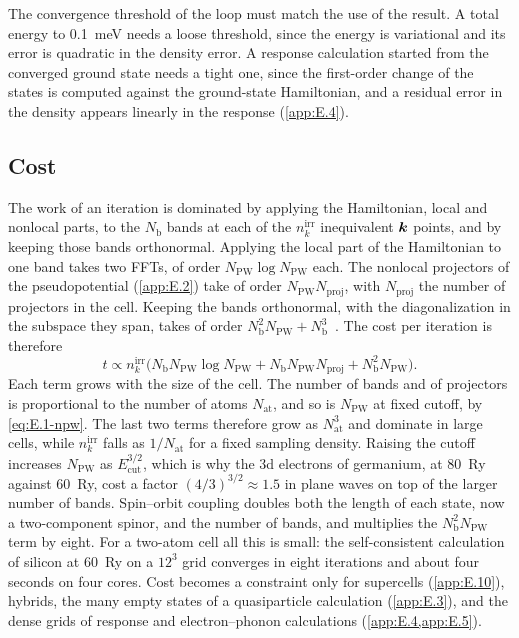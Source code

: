 The convergence threshold of the loop must match the use of the result. A total energy to \SI{0.1}{meV} needs a loose threshold, since the energy is variational and its error is quadratic in the density error. A response calculation started from the converged ground state needs a tight one, since the first-order change of the states is computed against the ground-state Hamiltonian, and a residual error in the density appears linearly in the response (\cref{app:E.4}).

\subsection{Cost}

The work of an iteration is dominated by applying the Hamiltonian, local and nonlocal parts, to the $N_{\mathrm{b}}$ bands at each of the $n_k^{\mathrm{irr}}$ inequivalent $\bm{k}$ points, and by keeping those bands orthonormal. Applying the local part of the Hamiltonian to one band takes two FFTs, of order $N_{\mathrm{PW}}\log N_{\mathrm{PW}}$ each. The nonlocal projectors of the pseudopotential (\cref{app:E.2}) take of order $N_{\mathrm{PW}}N_{\mathrm{proj}}$, with $N_{\mathrm{proj}}$ the number of projectors in the cell. Keeping the bands orthonormal, with the diagonalization in the subspace they span, takes of order $N_{\mathrm{b}}^2N_{\mathrm{PW}} + N_{\mathrm{b}}^3$~\cite{payne1992iterative}. The cost per iteration is therefore
\begin{equation}
  t \propto n_k^{\mathrm{irr}}\bigl(N_{\mathrm{b}}N_{\mathrm{PW}}\log N_{\mathrm{PW}} + N_{\mathrm{b}}N_{\mathrm{PW}}N_{\mathrm{proj}} + N_{\mathrm{b}}^2N_{\mathrm{PW}}\bigr) .
  \label{eq:E.1-cost}
\end{equation}
Each term grows with the size of the cell. The number of bands and of projectors is proportional to the number of atoms $N_{\mathrm{at}}$, and so is $N_{\mathrm{PW}}$ at fixed cutoff, by \cref{eq:E.1-npw}. The last two terms therefore grow as $N_{\mathrm{at}}^3$ and dominate in large cells, while $n_k^{\mathrm{irr}}$ falls as $1/N_{\mathrm{at}}$ for a fixed sampling density. Raising the cutoff increases $N_{\mathrm{PW}}$ as $E_{\mathrm{cut}}^{3/2}$, which is why the 3d electrons of germanium, at \SI{80}{Ry} against \SI{60}{Ry}, cost a factor $(4/3)^{3/2} \approx 1.5$ in plane waves on top of the larger number of bands. Spin--orbit coupling doubles both the length of each state, now a two-component spinor, and the number of bands, and multiplies the $N_{\mathrm{b}}^2N_{\mathrm{PW}}$ term by eight. For a two-atom cell all this is small: the self-consistent calculation of silicon at \SI{60}{Ry} on a $12^3$ grid converges in eight iterations and about four seconds on four cores. Cost becomes a constraint only for supercells (\cref{app:E.10}), hybrids, the many empty states of a quasiparticle calculation (\cref{app:E.3}), and the dense grids of response and electron--phonon calculations (\cref{app:E.4,app:E.5}).

